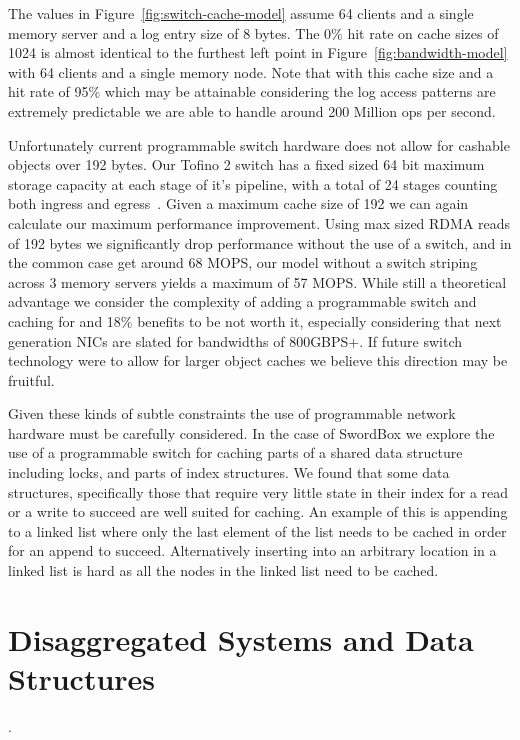 \documentclass[12pt]{ucsddissertation}
\newcommand{\sword}{SwordBox}
\begin{document}
The values in Figure~\ref{fig:switch-cache-model} assume 64 clients and a single memory server and a
log entry size of 8 bytes. The 0\% hit rate on cache sizes of 1024 is almost identical to the
furthest left point in Figure~\ref{fig:bandwidth-model} with 64 clients and a single memory node.
Note that with this cache size and a hit rate of 95\% which may be attainable considering the log
access patterns are extremely predictable we are able to handle around 200 Million ops per second.

Unfortunately current programmable switch hardware does not allow for cashable objects over 192
bytes. Our Tofino 2 switch has a fixed sized 64 bit maximum storage capacity at each stage of it's
pipeline, with a total of 24 stages counting both ingress and egress~\cite{tofino2}. Given a maximum
cache size of 192 we can again calculate our maximum performance improvement. Using max sized RDMA
reads of 192 bytes we significantly drop performance without the use of a switch, and in the common
case get around 68 MOPS, our model without a switch striping across 3 memory servers yields a
maximum of 57 MOPS. While still a theoretical advantage we consider the complexity of adding a
programmable switch and caching for and 18\% benefits to be not worth it, especially considering
that next generation NICs are slated for bandwidths of 800GBPS+. If future switch technology were to
allow for larger object caches we believe this direction may be fruitful.

Given these kinds of subtle constraints the use of programmable network hardware must be carefully
considered. In the case of {\sword} we explore the use of a programmable switch for caching parts of a
shared data structure including locks, and parts of index structures. We found that some data
structures, specifically those that require very little state in their index for a read or a write
to succeed are well suited for caching. An example of this is appending to a linked list where only
the last element of the list needs to be cached in order for an append to succeed. Alternatively
inserting into an arbitrary location in a linked list is hard as all the nodes in the linked list
need to be cached.

\section{Disaggregated Systems and Data Structures}
.
\end{document}
